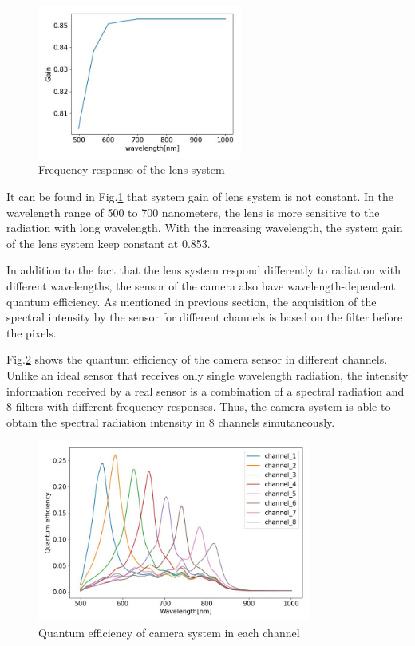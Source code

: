 \begin{figure}[htbp]
    \centering
    \includegraphics[width=0.6\textwidth]{figures/tr_frequency_response.jpg}
    \caption{Frequency response of the lens system}
    \label{fig: frequency_response_lens}
\end{figure}


It can be found in Fig.\ref{fig: frequency_response_lens} that system gain 
of lens system is not constant. In the wavelength range of 500 to 700 nanometers, 
the lens is more sensitive to the radiation with long wavelength. With the 
increasing wavelength, the system gain of the lens system keep constant at 0.853.


In addition to the fact that the lens system respond differently to radiation
with different wavelengths, the sensor of the camera also have wavelength-dependent quantum 
efficiency. As mentioned in previous section, the acquisition of the spectral 
intensity by the sensor for different channels is based on the filter 
before the pixels. 


Fig.\ref{fig: quantum_efficiency} shows the quantum efficiency 
of the camera sensor in different channels. Unlike an ideal sensor that 
receives only single wavelength radiation, the intensity information received 
by a real sensor is a combination of a spectral radiation and 8 filters with 
different frequency responses. Thus, the camera system is able to obtain the 
spectral radiation intensity in 8 channels simutaneously. 


\begin{figure}[htbp]
    \centering
    \includegraphics[width = 0.8\textwidth]{figures/quantum_efficiency.jpg}
    \caption{Quantum efficiency of camera system in each channel}
    \label{fig: quantum_efficiency}
\end{figure}


